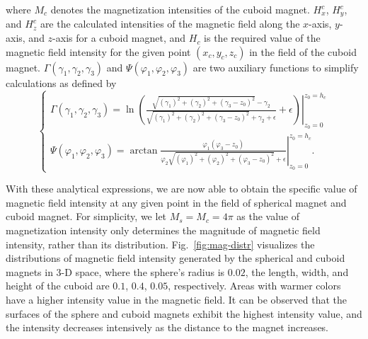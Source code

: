 \documentclass[journal]{IEEEtran}
\begin{document}
where $M_c$ denotes the magnetization intensities of the cuboid magnet. $H_x^c$, $H_y^c$, and $H_z^c$ are the calculated intensities of the magnetic field along the $x$-axis, $y$-axis, and $z$-axis for a cuboid magnet, and $H_c$ is the required value of the magnetic field intensity for the given point $(x_c, y_c, z_c)$ in the field of the cuboid magnet.
$\Gamma(\gamma_{1},\gamma_{2},\gamma_{3})$ and $\Psi(\varphi_{1},\varphi_{2},\varphi_{3})$ are two auxiliary functions to simplify calculations as defined by
\begin{equation}
    \left\{\begin{array}{lr}
    \Gamma(\gamma_{1},\gamma_{2},\gamma_{3}) \!\! = \!\! \left.\ln\!\left(\frac{\sqrt{(\gamma_{1})^2+(\gamma_{2})^2+(\gamma_{3}-z_{0})^2}-\gamma_{2}}{{\sqrt{(\gamma_{1})^2+(\gamma_{2})^2+(\gamma_{3}-z_{0})^2}+\gamma_{2}}+\epsilon} +\epsilon\right)\!\right|_{z_{0}=0}^{z_{0}=h_c} \\
    
    \Psi(\varphi_{1},\varphi_{2},\varphi_{3}) \!\! = \!\! \left.\arctan\frac{\varphi_{1}(\varphi_{3}-z_{0})}{\varphi_{2}\sqrt{(\varphi_{1})^2+(\varphi_{2})^2+(\varphi_{3}-z_{0})^2}+\epsilon}\right|_{z_{0}=0}^{z_{0}=h_c}.
    \end{array}\right.
\label{mag-cub}
\end{equation}


With these analytical expressions, we are now able to obtain the specific value of magnetic field intensity at any given point in the field of spherical magnet and cuboid magnet.
For simplicity, we let $M_s = M_c = 4\pi$ as the value of magnetization intensity only determines the magnitude of magnetic field intensity, rather than its distribution.
Fig.~\ref{fig:mag-distr} visualizes the distributions of magnetic field intensity generated by the spherical and cuboid magnets in 3-D space, where the sphere's radius is $0.02$, the length, width, and height of the cuboid are $0.1$, $0.4$, $0.05$, respectively.
Areas with warmer colors have a higher intensity value in the magnetic field.
It can be observed that the surfaces of the sphere and cuboid magnets exhibit the highest intensity value, and the intensity decreases intensively as the distance to the magnet increases.
\end{document}
